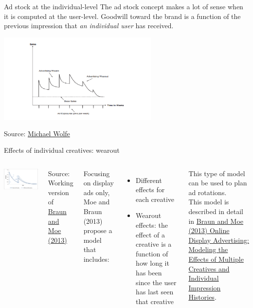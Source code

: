 \documentclass[10pt, aspectratio=169]{beamer}
\newcommand{\source}[1]{\begin{flushright} \footnotesize Source: {#1} \end{flushright} \normalsize}
\begin{document}
\begin{frame}{Ad stock at the individual-level}
The ad stock concept makes a lot of sense when it is computed at the user-level.  Goodwill toward the brand is a function of the previous impression that \emph{an individual user} has received.  
\begin{center}
\includegraphics[width=0.6\textwidth]{images/adresponseovertime.png}
\end{center} 
\source{\href{https://www.linkedin.com/pulse/new-tools-determining-measuring-wear-in-wear-out-media-michael-wolfe}{Michael Wolfe}}
\end{frame}

\begin{frame}{Effects of individual creatives: wearout}
\begin{columns}
\includegraphics[width=\textwidth]{images/ad_stock_over_time.png}
\source{Working version of \href{https://drive.google.com/uc?export=download&id=0B0EzanlzLNsWRHZ6bFh6aHZXQ28}{Braun and Moe (2013)}}
Focusing on display ads only, Moe and Braun (2013) propose a model that includes: 
\begin{itemize}
\item Different effects for each creative
\item Wearout effects: the effect of a creative is a function of how long it has been since the user has last seen that creative
\end{itemize}
This type of model can be used to plan ad rotations.\\
\bigskip
This model is described in detail in \href{https://drive.google.com/uc?export=download&id=0B0EzanlzLNsWRHZ6bFh6aHZXQ28}{Braun and Moe (2013) Online Display Advertising: Modeling the Effects of Multiple Creatives and Individual Impression Histories}.
\end{columns}
\end{frame}
\end{document}
